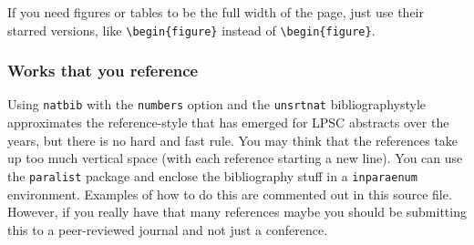\documentclass[twoside]{article}
\begin{document}
If you need figures or tables to be the full width of the page,
just use their starred versions, like \verb=\begin{figure}= instead
of \verb=\begin{figure}=.

\subsubsection*{Works that you reference}

Using \texttt{natbib} with the \texttt{numbers} option and the
\texttt{unsrtnat} bibliographystyle approximates the reference-style
that has emerged for LPSC abstracts over the years, but there is
no hard and fast rule.  You may think that the references take up
too much vertical space (with each reference starting a new line).
You can use the \texttt{paralist} package and enclose the bibliography
stuff in a \texttt{inparaenum} environment.  Examples of how to do
this are commented out in this source file.  However, if you really
have that many references maybe you should be submitting this to a
peer-reviewed journal and not just a conference.



\end{document}

